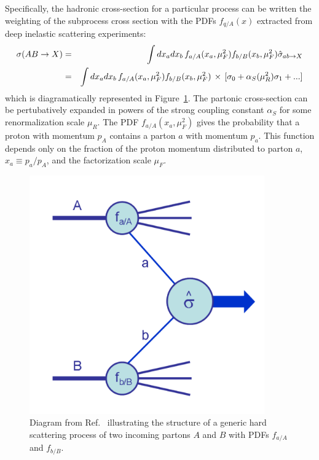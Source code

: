 Specifically, the hadronic cross-section for a particular process can be written the weighting of the subprocess cross section with the PDFs $f_{q/A}(x)$ extracted from deep inelastic scattering experiments\cite{Campbell:2006wx}:
\begin{eqnarray}
\sigma(AB\rightarrow X) &=& \int dx_a dx_b \,f_{a/A}(x_a,\mu_F^2) f_{b/B}(x_b,\mu_F^2) \hat{\sigma}_{ab \rightarrow X} \nonumber \\
&=& \int dx_a dx_b \,f_{a/A}(x_a,\mu_F^2) f_{b/B}(x_b,\mu_F^2) \,\times\,[\sigma_0 + \alpha_{S}(\mu_R^2)\sigma_1 + ...]
\label{eq:ab}
\end{eqnarray}
which is diagramatically represented in Figure~\ref{fig:factorize}. The partonic cross-section can be pertubatively expanded in powers of the strong coupling constant $\alpha_S$ for some renormalization scale $\mu_R$. The PDF $f_{a/A}(x_a,\mu_F^2)$ gives the probability that a proton with momentum $p_A$ contains a parton $a$ with momentum $p_a$. This function depends only on the fraction of the proton momentum distributed to parton $a$, $x_a \equiv p_a/p_A$, and the factorization scale $\mu_F$. 
\begin{figure}[h]
\includegraphics[width=0.9\textwidth]{fig/thry/Factorize.pdf}
\caption{Diagram from Ref.~\cite{Campbell:2006wx} illustrating the structure of a generic hard scattering process of two incoming partons $A$ and $B$ with PDFs $f_{a/A}$ and $f_{b/B}$.}
\label{fig:factorize}
\end{figure}











